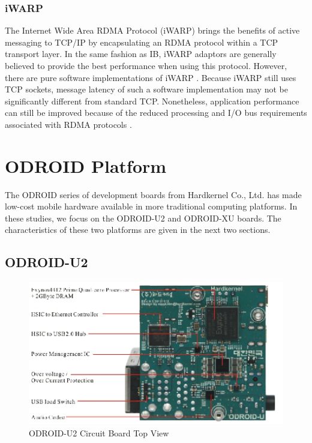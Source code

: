 \documentclass[11pt]{book}
\begin{document}
\subsubsection{\textbf{iWARP}}

The Internet Wide Area RDMA Protocol (iWARP) brings the benefits of active
messaging to TCP/IP by encapsulating an RDMA protocol within a TCP transport
layer. In the same fashion as IB, iWARP adaptors are generally believed to
provide the best performance when using this protocol. However, there are pure
software implementations of iWARP \cite{neeser-10}. Because iWARP still uses TCP
sockets, message latency of such a software implementation may not be
significantly different from standard TCP. Nonetheless, application performance
can still be improved because of the reduced processing and I/O bus requirements
associated with RDMA protocols \cite{narravula-07}.

\section{\textbf{ODROID Platform}}

The ODROID series of development boards from Hardkernel Co., Ltd. has made
low-cost mobile hardware available in more traditional computing platforms. In
these studies, we focus on the ODROID-U2 and ODROID-XU boards. The
characteristics of these two platforms are given in the next two sections.

\subsection{\textbf{ODROID-U2}}

\begin{figure}[h]
\includegraphics[width=\textwidth]{odroid_u2_top}
\caption{ODROID-U2 Circuit Board Top View \cite{odroid-u2-board-detail}}
\label{odroid-u2-board}
\end{figure}
\end{document}
